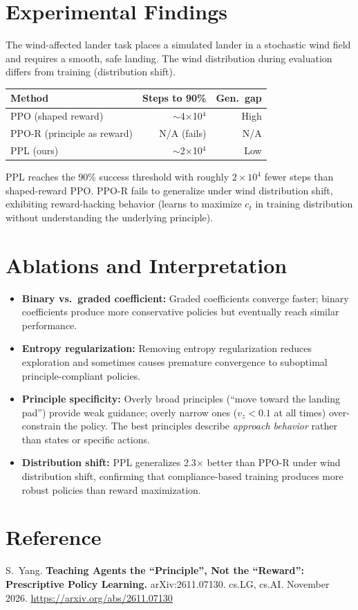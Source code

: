\documentclass[10pt,twocolumn]{article}
\begin{document}
\section{Experimental Findings}

The wind-affected lander task places a simulated lander in a stochastic wind field and requires a smooth, safe landing.
The wind distribution during evaluation differs from training (distribution shift).

\begin{center}
\small
\begin{tabular}{lrr}
\toprule
\textbf{Method} & \textbf{Steps to 90\%} & \textbf{Gen.\ gap} \\
\midrule
PPO (shaped reward) & $\sim$4$\times$10$^4$ & High \\
PPO-R (principle as reward) & N/A (fails) & N/A \\
PPL (ours) & $\sim$2$\times$10$^4$ & Low \\
\bottomrule
\end{tabular}
\end{center}

PPL reaches the 90\% success threshold with roughly $2\times10^4$ fewer steps than shaped-reward PPO.
PPO-R fails to generalize under wind distribution shift, exhibiting reward-hacking behavior (learns to maximize $c_t$ in training distribution without understanding the underlying principle).

\section{Ablations and Interpretation}

\begin{itemize}[leftmargin=1em,itemsep=2pt]
  \item \textbf{Binary vs.\ graded coefficient:} Graded coefficients converge faster; binary coefficients produce more conservative policies but eventually reach similar performance.
  \item \textbf{Entropy regularization:} Removing entropy regularization reduces exploration and sometimes causes premature convergence to suboptimal principle-compliant policies.
  \item \textbf{Principle specificity:} Overly broad principles (``move toward the landing pad'') provide weak guidance; overly narrow ones ($v_z < 0.1$ at all times) over-constrain the policy. The best principles describe \emph{approach behavior} rather than states or specific actions.
  \item \textbf{Distribution shift:} PPL generalizes 2.3$\times$ better than PPO-R under wind distribution shift, confirming that compliance-based training produces more robust policies than reward maximization.
\end{itemize}

\section*{Reference}
S.\ Yang.
\textbf{Teaching Agents the ``Principle'', Not the ``Reward'': Prescriptive Policy Learning.}
arXiv:2611.07130. cs.LG, cs.AI. November 2026.
\url{https://arxiv.org/abs/2611.07130}
\end{document}
